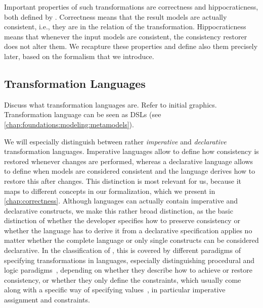 Important properties of such transformations are correctness and hippocraticness, both defined by \textcite{stevens2010sosym}.
Correctness means that the result models are actually consistent, i.e., they are in the relation of the transformation.
Hippocraticness means that whenever the input models are consistent, the consistency restorer does not alter them.
We recapture these properties and define also them precisely later, based on the formalism that we introduce.




\subsection{Transformation Languages}
\label{chap:foundations:transformations:languages}

Discuss what transformation languages are. Refer to initial graphics.
Transformation language can be seen as \glspl{DSL} (see \autoref{chap:foundations:modeling:metamodels}).

We will especially distinguish between rather \emph{imperative} and \emph{declarative} transformation languages.
Imperative languages allow to define how consistency is restored whenever changes are performed, whereas a declarative language allows to define when models are considered consistent and the language derives how to restore this after changes.
This distinction is most relevant for us, because it maps to different concepts in our formalization, which we present in \autoref{chap:correctness}.
Although languages can actually contain imperative and declarative constructs, we make this rather broad distinction, as the basic distinction of whether the developer specifies how to preserve consistency or whether the language has to derive it from a declarative specification applies no matter whether the complete language or only single constructs can be considered declarative.
In the classification of \textcite{czarnecki2006a}, this is covered by different paradigms of specifying transformations in languages, especially distinguishing procedural and logic paradigms~\cite[Fig.~20]{czarnecki2006a}, depending on whether they describe how to achieve or restore consistency, or whether they only define the constraints, which usually come along with a specific way of specifying values~\cite[Fig.~20]{czarnecki2006a}, in particular imperative assignment and constraints.

